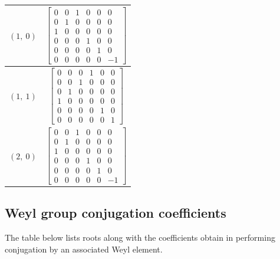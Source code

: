 \documentclass[11pt]{article}
\theoremstyle{definition}
\begin{document}
\begin{longtable}{|l|c|}
    \hline
    $\left( 1, \  0\right)$ & ${\left[\begin{matrix}0 & 0 & 1 & 0 & 0 & 0\\0 & 1 & 0 & 0 & 0 & 0\\1 & 0 & 0 & 0 & 0 & 0\\0 & 0 & 0 & 1 & 0 & 0\\0 & 0 & 0 & 0 & 1 & 0\\0 & 0 & 0 & 0 & 0 & -1\end{matrix}\right]}$ \\
    \hline
    $\left( 1, \  1\right)$ & ${\left[\begin{matrix}0 & 0 & 0 & 1 & 0 & 0\\0 & 0 & 1 & 0 & 0 & 0\\0 & 1 & 0 & 0 & 0 & 0\\1 & 0 & 0 & 0 & 0 & 0\\0 & 0 & 0 & 0 & 1 & 0\\0 & 0 & 0 & 0 & 0 & 1\end{matrix}\right]}$ \\
    \hline
    $\left( 2, \  0\right)$ & ${\left[\begin{matrix}0 & 0 & 1 & 0 & 0 & 0\\0 & 1 & 0 & 0 & 0 & 0\\1 & 0 & 0 & 0 & 0 & 0\\0 & 0 & 0 & 1 & 0 & 0\\0 & 0 & 0 & 0 & 1 & 0\\0 & 0 & 0 & 0 & 0 & -1\end{matrix}\right]}$ \\
    \hline
\end{longtable}


\subsection{Weyl group conjugation coefficients}

The table below lists roots along with the coefficients obtain in performing conjugation by an associated Weyl element.

\bigskip
\end{document}
